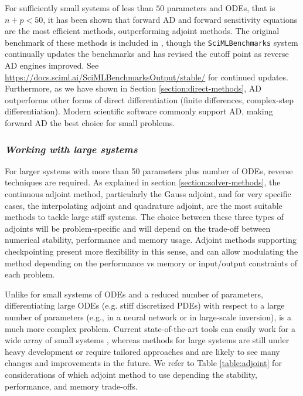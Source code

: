 For sufficiently small systems of less than $50$ parameters and ODEs, that is $n + p < 50$, it has been shown that forward AD and forward sensitivity equations are the most efficient methods, outperforming adjoint methods. 
The original benchmark of these methods is included in \cite{ma2021comparison}, though the \texttt{SciMLBenchmarks} system continually updates the benchmarks and has revised the cutoff point as reverse AD engines improved. 
See \url{https://docs.sciml.ai/SciMLBenchmarksOutput/stable/} for continued updates.
Furthermore, as we have shown in Section \ref{section:direct-methods}, AD outperforms other forms of direct differentiation (finite differences, complex-step differentiation). 
Modern scientific software commonly support AD, making forward AD the best choice for small problems. 

\subsubsection*{\textit{Working with large systems}}

For larger systems with more than 50 parameters plus number of ODEs, reverse techniques are required. 
As explained in section \ref{section:solver-methods}, the continuous adjoint method, particularly the Gauss adjoint, and for very specific cases, the interpolating adjoint and quadrature adjoint, are the most suitable methods to tackle large stiff systems. 
The choice between these three types of adjoints will be problem-specific and will depend on the trade-off between numerical stability, performance and memory usage. 
Adjoint methods supporting checkpointing present more flexibility in this sense, and can allow modulating the method depending on the performance vs memory or input/output constraints of each problem. 

Unlike for small systems of ODEs and a reduced number of parameters, differentiating large ODEs (e.g. stiff discretized PDEs) with respect to a large number of parameters (e.g., in a neural network or in large-scale inversion), is a much more complex problem. 
Current state-of-the-art tools can easily work for a wide array of small systems \cite{rackauckas2020universal}, whereas methods for large systems are still under heavy development or require tailored approaches and are likely to see many changes and improvements in the future.
We refer to Table \ref{table:adjoint} for considerations of which adjoint method to use depending the stability, performance, and memory trade-offs. 

